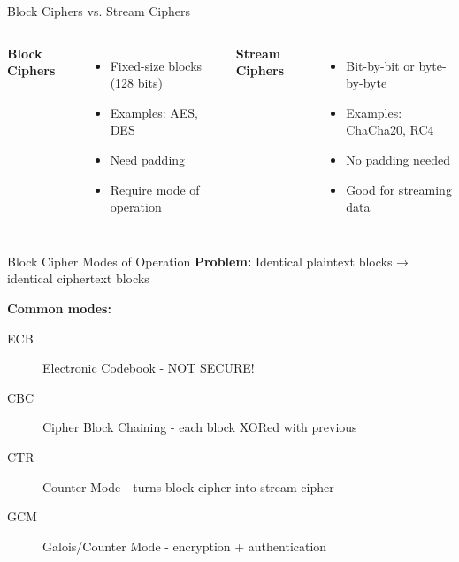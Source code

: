\documentclass{beamer}
\begin{document}
\begin{frame}{Block Ciphers vs. Stream Ciphers}
\begin{columns}
\textbf{Block Ciphers}
\begin{itemize}
    \item Fixed-size blocks (128 bits)
    \item Examples: AES, DES
    \item Need padding
    \item Require mode of operation
\end{itemize}
\pause

\textbf{Stream Ciphers}
\begin{itemize}
    \item Bit-by-bit or byte-by-byte
    \item Examples: ChaCha20, RC4
    \item No padding needed
    \item Good for streaming data
\end{itemize}
\end{columns}

\vspace{0.5cm}
\end{frame}

\begin{frame}{Block Cipher Modes of Operation}
\textbf{Problem:} Identical plaintext blocks → identical ciphertext blocks

\vspace{0.3cm}
\textbf{Common modes:}
\begin{description}
    \item[ECB] Electronic Codebook - \alert{NOT SECURE!}
    \item[CBC] Cipher Block Chaining - each block XORed with previous
    \item[CTR] Counter Mode - turns block cipher into stream cipher
    \item[GCM] Galois/Counter Mode - encryption + authentication
\end{description}

\end{frame}
\end{document}
